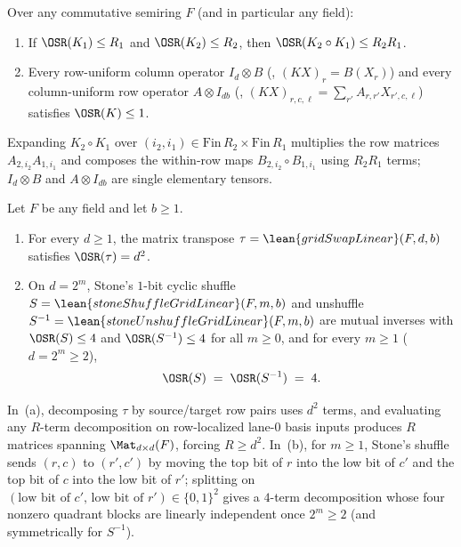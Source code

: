 \begin{lemma}\label{lem:osr-submult}
Over any commutative semiring $F$ (and in particular any field):
\begin{enumerate}[label=(\alph*)]
\item If $\OSR(K_1) \le R_1$ and $\OSR(K_2) \le R_2$, then $\OSR(K_2 \circ K_1) \le R_2 R_1$.
\item Every row-uniform column operator $I_d \otimes B$ (, $(KX)_r = B(X_r)$)
  and every column-uniform row operator $A \otimes I_{db}$ (,
  $(KX)_{r,c,\ell} = \sum_{r'} A_{r,r'} X_{r',c,\ell}$) satisfies $\OSR(K) \le 1$.
\end{enumerate}
\end{lemma}
\begin{outline}
Expanding $K_2 \circ K_1$ over $(i_2, i_1) \in \mathrm{Fin}\,R_2 \times \mathrm{Fin}\,R_1$ multiplies
the row matrices $A_{2,i_2} A_{1,i_1}$ and composes the within-row maps $B_{2,i_2} \circ B_{1,i_1}$
using $R_2 R_1$ terms; $I_d \otimes B$ and $A \otimes I_{db}$ are single elementary tensors.
\end{outline}

\begin{theorem}\label{thm:osr-swap}
Let $F$ be any field and let $b \ge 1$.
\begin{enumerate}[label=(\alph*)]
\item For every $d \ge 1$, the matrix transpose $\tau = \lean{gridSwapLinear}(F, d, b)$ satisfies
  $\OSR(\tau) = d^2$.
\item On $d = 2^m$, Stone's $1$-bit cyclic shuffle $S = \lean{stoneShuffleGridLinear}(F, m, b)$ and
  unshuffle $S^{-1} = \lean{stoneUnshuffleGridLinear}(F, m, b)$ are mutual inverses with
  $\OSR(S) \le 4$ and $\OSR(S^{-1}) \le 4$ for all $m \ge 0$, and for every $m \ge 1$ ($d = 2^m \ge 2$),
  \[
    \OSR(S) \;=\; \OSR(S^{-1}) \;=\; 4.
  \]
\end{enumerate}
\end{theorem}
\begin{outline}
In~(a), decomposing $\tau$ by source/target row pairs uses $d^2$ terms, and evaluating any $R$-term
decomposition on row-localized lane-$0$ basis inputs produces $R$ matrices spanning $\Mat_{d\times d}(F)$,
forcing $R \ge d^2$. In~(b), for $m \ge 1$, Stone's shuffle sends $(r, c)$ to $(r', c')$ by moving
the top bit of $r$ into the low bit of $c'$ and the top bit of $c$ into the low bit of $r'$;
splitting on $(\text{low bit of } c',\, \text{low bit of } r') \in \{0,1\}^2$ gives a $4$-term
decomposition whose four nonzero quadrant blocks are linearly independent once $2^m \ge 2$ (and
symmetrically for $S^{-1}$).
\end{outline}

